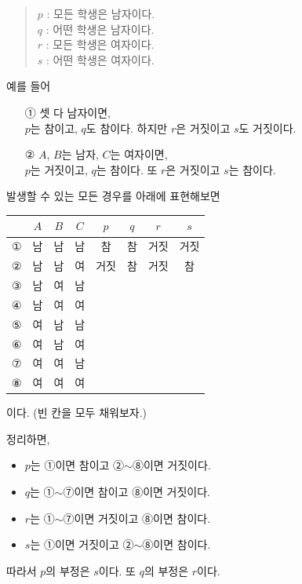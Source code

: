\documentclass{oblivoir}
\begin{document}
%
\begin{quote}\label{negation14}
\(p\) : 모든 학생은 남자이다.\\
\(q\) : 어떤 학생은 남자이다.\\
\(r\) : 모든 학생은 여자이다.\\
\(s\) : 어떤 학생은 여자이다.
\end{quote}
예를 들어
\begin{itemize}
\item[①]
셋 다 남자이면,\\
\(p\)는 참이고, \(q\)도 참이다.
하지만 \(r\)은 거짓이고 \(s\)도 거짓이다.
\item[②]
\(A\), \(B\)는 남자, \(C\)는 여자이면,\\
\(p\)는 거짓이고, \(q\)는 참이다.
또 \(r\)은 거짓이고 \(s\)는 참이다.
\end{itemize}
발생할 수 있는 모든 경우를 아래에 표현해보면
\begin{center}
\begin{tabu}[tabulinesep=100pt]{c|ccc|cccc}
	&\(A\)	&\(B\)	&\(C\)	&\(p\)	&\(q\)	&\(r\)	&\(s\)\\\hline
①	&남		&남		&남		&참		&참		&거짓	&거짓\\
②	&남		&남		&여		&거짓	&참		&거짓	&참	\\
③	&남		&여		&남\\
④	&남		&여		&여\\
⑤	&여		&남		&남\\
⑥	&여		&남		&여\\
⑦	&여		&여		&남\\
⑧	&여		&여		&여
\end{tabu}
\end{center}
이다.
(빈 칸을 모두 채워보자.)

\newpage
정리하면,
\begin{itemize}
\item
\(p\)는 ①이면 참이고 ②\(\sim\)⑧이면 거짓이다.
\item
\(q\)는 ①\(\sim\)⑦이면 참이고 ⑧이면 거짓이다.
\item
\(r\)는 ①\(\sim\)⑦이면 거짓이고 ⑧이면 참이다.
\item
\(s\)는 ①이면 거짓이고 ②\(\sim\)⑧이면 참이다.
\end{itemize}
따라서 \(p\)의 부정은 \(s\)이다.
또 \(q\)의 부정은 \(r\)이다.
\end{document}
